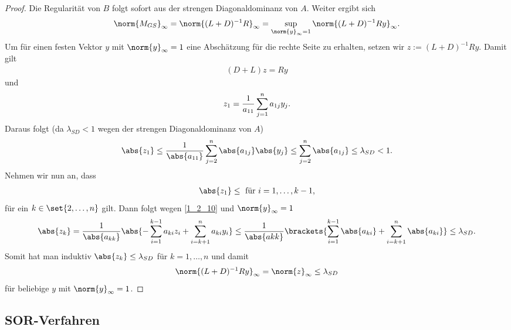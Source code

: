 \begin{proof}
	Die Regularität von $B$ folgt sofort aus der strengen Diagonaldominanz von $A$. Weiter ergibt sich
	\begin{align}
		\norm{M_{GS}}_{\infty} = \norm{(L+D)^{-1}R}_{\infty} = \sup_{\norm{y}_{\infty}=1} \norm{(L+D)^{-1}Ry}_{\infty}. \notag
	\end{align}
	Um für einen festen Vektor $y$ mit $\norm{y}_{\infty} = 1$ eine Abschätzung für die rechte Seite zu erhalten, setzen wir $z:= (L+D)^{-1}Ry$. Damit gilt
	\begin{align}
		(D+L)z = Ry \label{1_2_10}
	\end{align}
	und
	\begin{align}
	z_1 = \frac{1}{a_{11}} \sum_{j=1}^{n} a_{1j}y_j. \notag
	\end{align}
	Daraus folgt (da $\lambda_{SD} < 1$ wegen der strengen Diagonaldominanz von $A$)
	\begin{align}
		\abs{z_1} 
		\le \frac{1}{\abs{a_{11}}} \sum_{j=2}^{n} \abs{a_{1j}}\abs{y_j} 
		\le \sum_{j=2}^{n} \abs{a_{1j}} \le \lambda_{SD} < 1.\notag
	\end{align}
	Nehmen wir nun an, dass
	\begin{align}
		\abs{z_1} \le \text{ für } i = 1, \dots, k-1, \notag
	\end{align}
	für ein $k \in \set{2,\dots,n}$ gilt. Dann folgt wegen \eqref{1_2_10} und $\norm{y}_{\infty} = 1$
	\begin{align}
		\abs{z_k} = \frac{1}{\abs{a_{kk}}} \abs{-\sum_{i=1}^{k-1} a_{ki}z_i + \sum_{i=k+1}^{n} a_{ki}y_i} 
		\le \frac{1}{\abs{a{kk}}} \brackets{\sum_{i=1}^{k-1} \abs{a_{ki}} + \sum_{i=k+1}^{n} \abs{a_{ki}}} \le \lambda_{SD}. \notag
	\end{align}
	Somit hat man induktiv $\abs{z_k} \le \lambda_{SD}$ für $k = 1, \dots, n$ und damit
	\begin{align}
		\norm{(L+D)^{-1}Ry}_{\infty} = \norm{z}_{\infty} \le \lambda_{SD} \notag
	\end{align}
	für beliebige $y$ mit $\norm{y}_{\infty} = 1$.
\end{proof}

\subsection{SOR-Verfahren}

